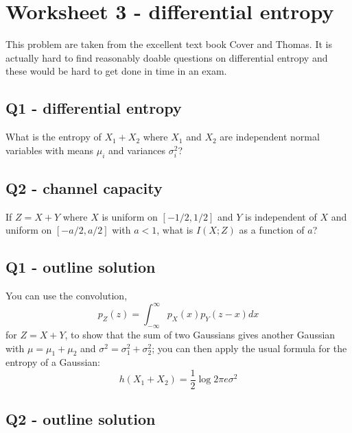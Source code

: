 \documentclass[12pt]{article}
\begin{document}
\section*{Worksheet 3 - differential entropy} 

This problem are taken from the excellent text book Cover and
Thomas. It is actually hard to find reasonably doable questions on
differential entropy and these would be hard to get done in time in an
exam.

\subsection*{Q1 - differential entropy}

What is the entropy of $X_1+X_2$ where $X_1$ and $X_2$ are independent normal variables with means $\mu_i$ and variances $\sigma_i^2$?



\subsection*{Q2 - channel capacity}

If $Z=X+Y$ where $X$ is uniform on $[-1/2,1/2]$ and $Y$ is independent of $X$ and uniform on $[-a/2,a/2]$ with $a<1$, what is $I(X;Z)$ as a function of $a$?

\newpage

\subsection*{Q1 - outline solution}

You can use the convolution,
\begin{equation}
  p_Z(z)=\int_{-\infty}^\infty p_X(x)p_Y(z-x)dx
\end{equation}
for $Z=X+Y$, to show that the sum of two Gaussians gives another Gaussian with $\mu=\mu_1+\mu_2$ and $\sigma^2=\sigma_1^2+\sigma_2^2$; you can then apply the usual formula for the entropy of a Gaussian:
\begin{equation}
  h(X_1+X_2)=\frac{1}{2}\log{2\pi e \sigma^2}
\end{equation}

\subsection*{Q2 - outline solution}
\end{document}
